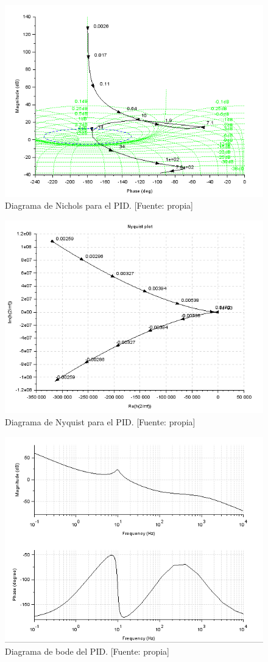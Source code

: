 \documentclass[12pt,letterpaper]{article}
\begin{document}
\begin{figure}[hbtp]
	\centering
	\includegraphics[width = .75 \columnwidth]{nicPID_.png} 
	\caption[Figura7]{Diagrama de Nichols para el PID. [Fuente: propia]} 
	\label{nicPID} 
\end{figure}

\begin{figure}[hbtp]
	\centering
	\includegraphics[width = 0.8 \columnwidth]{nyqpid.png} 
	\caption[Figura7]{Diagrama de Nyquist para el PID. [Fuente: propia]} 
	\label{nyqpid} 
\end{figure}

\begin{figure}[hbtp]
	\centering
	\includegraphics[width = .75 \columnwidth]{bodePID.png} 
	\caption[Figura7]{Diagrama de bode del PID. [Fuente: propia]} 
	\label{fig:fig10} 
\end{figure}
\end{document}
